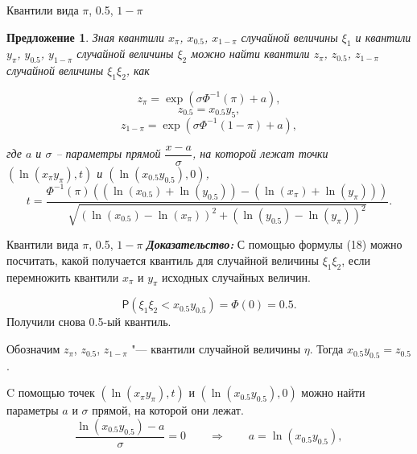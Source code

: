 \documentclass[ucs, notheorems, handout]{beamer}
\newtheorem{proposition}[theorem]{Предложение}
\begin{document}
	\begin{frame}{Квантили вида $\pi$, 0.5, $1-\pi$}
	
		\begin{proposition}
		Зная квантили $x_{\pi}$, $x_{0.5}$, $x_{1-\pi}$ случайной величины $\xi_{1}$ и квантили $y_{\pi}$, $y_{0.5}$, $y_{1-\pi}$ случайной величины $\xi_{2}$ можно найти квантили $z_{\pi}$, $z_{0.5}$, $z_{1-\pi}$ случайной величины $\xi_{1}\xi_{2}$, как
		
		\begin{equation*}
			z_{\pi}=\exp(\sigma\Phi^{-1}(\pi)+a),
		\end{equation*}
		\begin{equation*}
			z_{0.5}=x_{0.5}y_{5},
		\end{equation*}
		\begin{equation*}
			z_{1-\pi}=\exp(\sigma\Phi^{-1}(1-\pi)+a),
		\end{equation*}
		
		где $a$ и $\sigma$ -- параметры прямой $\dfrac{x-a}{\sigma}$, на которой лежат точки $(\ln(x_{\pi}y_{\pi}), t)$ и $(\ln(x_{0.5}y_{0.5}),0)$,
		\begin{equation*}
			t = \frac{\Phi^{-1}(\pi)((\ln(x_{0.5})+\ln(y_{0.5}))-(\ln(x_{\pi})+\ln(y_{\pi})))}{\sqrt{(\ln(x_{0.5})-\ln(x_{\pi}))^{2}+(\ln(y_{0.5})-\ln(y_{\pi}))^{2}}}. 
		\end{equation*}
	\end{proposition}
\end{frame}

\begin{frame}{Квантили вида $\pi$, 0.5, $1-\pi$}
	\textbf{\textit{Доказательство:}}
	С помощью формулы (18) можно посчитать, какой получается квантиль для случайной величины $\xi_{1}\xi_{2}$, если перемножить квантили $x_{\pi}$ и $y_{\pi}$ исходных случайных величин.
	
	\begin{equation*}
		\mathsf{P}(\xi_{1} \xi_{2} < x_{0.5}y_{0.5}) = \Phi(0) = 0.5.
	\end{equation*}
	Получили снова 0.5-ый квантиль. 
	
	Обозначим $z_{\pi}$, $z_{0.5}$, $z_{1-\pi}$ "--- квантили случайной величины $\eta$.
	Тогда $x_{0.5}y_{0.5} = z_{0.5}$.
	
	C помощью точек $(\ln(x_{\pi}y_{\pi}), t)$ и $(\ln(x_{0.5}y_{0.5}),0)$  можно найти параметры $a$ и $\sigma$ прямой, на которой они лежат.
	\begin{equation*}
		\dfrac{\ln(x_{0.5}y_{0.5})-a}{\sigma}=0 \quad\quad \Rightarrow \quad\quad a=\ln(x_{0.5}y_{0.5}),
	\end{equation*}
	
\end{frame}
\end{document}
